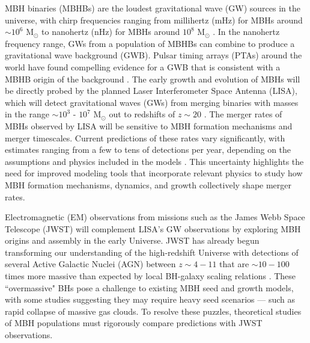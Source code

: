 \documentclass[11pt, letterpaper]{article}
\newcommand{\msun}{M$_{\odot}$}
\begin{document}
MBH binaries (MBHBs) are the loudest gravitational wave (GW) sources in the universe, with chirp frequencies ranging from millihertz (mHz) for MBHs around $\sim 10^6$ \msun{} to nanohertz (nHz) for MBHs around $10^8$ \msun{} \citep{Sesana2013}. In the nanohertz frequency range, GWs from a population of MBHBs can combine to produce a gravitational wave background (GWB). Pulsar timing arrays (PTAs) around the world have found compelling evidence for a GWB that is consistent with a MBHB origin of the background \citep{agazie_nanograv_2023,antoniadis_second_2023,reardon_search_2023,xu_searching_2023}. The early growth and evolution of MBHs will be directly probed by the planned Laser Interferometer Space Antenna (LISA), which will detect gravitational waves (GWs) from merging binaries with masses in the range $\sim 10^3$ - $10^7$ \msun{} out to redshifts of $z \sim 20$ \citep{Amaro2017lisa}. The merger rates of MBHs observed by LISA will be sensitive to MBH formation mechanisms and merger timescales. Current predictions of these rates vary significantly, with estimates ranging from a few to tens of detections per year, depending on the assumptions and physics included in the models \citep{Klein_2016,Kelley_2017a,Kelley_2018,Dayal_2019,Katz2020}. This uncertainty highlights the need for improved modeling tools that incorporate relevant physics to study how MBH formation mechanisms, dynamics, and growth collectively shape merger rates. 

Electromagnetic (EM) observations from missions such as the James Webb Space Telescope (JWST) will complement LISA's GW observations by exploring MBH origins and assembly in the early Universe. JWST has already begun transforming our understanding of the high-redshift Universe with detections of several Active Galactic Nuclei (AGN) between $z \sim 4-11$ that are $\sim 10-100$ times more massive than expected by local BH-galaxy scaling relations \citep{Larson_2023, harikane2023jwstnirspeccensusbroadlineagns, matthee2024littlereddotsabundant, goulding2023uncovergrowthmassiveblack}. These ``overmassive" BHs pose a challenge to existing MBH seed and growth models, with some studies \citep{Pacucci_2023,natarajan2023detectionovermassiveblackhole} suggesting they may require heavy seed scenarios — such as rapid collapse of massive gas clouds. To resolve these puzzles, theoretical studies of MBH populations must rigorously compare predictions with JWST observations.
\end{document}
